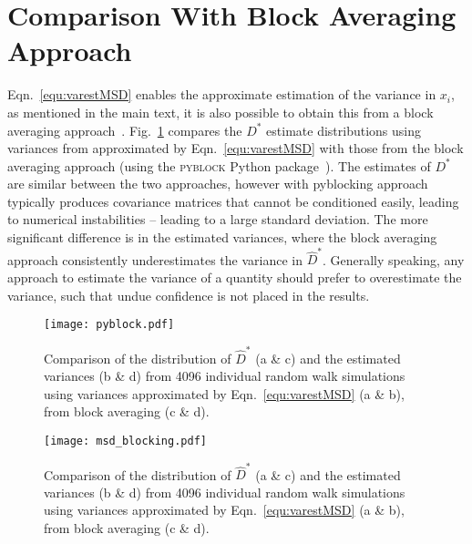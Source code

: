 \documentclass[reprint,superscriptaddress,nobibnotes,amsmath,amssymb,aps,prx,hidelinks,linenumbers]{revtex4-2}
\newcommand{\oMSDi}{\ensuremath{x_i}}
\newcommand{\Dest}{\ensuremath{\widehat{D}^*}}
\newcommand{\D}{\ensuremath{D^*}}
\begin{document}
\section{Comparison With Block Averaging Approach}
\label{sec:block}
Eqn.~\ref{equ:varestMSD} enables the approximate estimation of the variance in $\oMSDi$, as mentioned in the main text, it is also possible to obtain this from a block averaging approach~\cite{flyvbjerg_error_1989,frenkel_understanding_2023}.
Fig.~\ref{fig:pyblock} compares the $\D$ estimate distributions using variances from approximated by Eqn.~\ref{equ:varestMSD} with those from the block averaging approach (using the \textsc{pyblock} Python package~\cite{spencer_pyblock_2020}).
The estimates of $\D$ are similar between the two approaches, however with pyblocking approach typically produces covariance matrices that cannot be conditioned easily, leading to numerical instabilities -- leading to a large standard deviation.
The more significant difference is in the estimated variances, where the block averaging approach consistently underestimates the variance in $\Dest$. 
Generally speaking, any approach to estimate the variance of a quantity should prefer to overestimate the variance, such that undue confidence is not placed in the results. 

\begin{figure}
    \centering
    \texttt{[image: pyblock.pdf]}
    \caption{Comparison of the distribution of $\Dest$ (a \& c) and the estimated variances (b \& d) from 4096 individual random walk simulations using variances approximated by Eqn.~\ref{equ:varestMSD} (a \& b), from block averaging (c \& d).}
    \label{fig:pyblock}
\end{figure}

\begin{figure}
    \centering
    \texttt{[image: msd\_blocking.pdf]}
    \caption{Comparison of the distribution of $\Dest$ (a \& c) and the estimated variances (b \& d) from 4096 individual random walk simulations using variances approximated by Eqn.~\ref{equ:varestMSD} (a \& b), from block averaging (c \& d).}
    \label{fig:msd_blocking}
\end{figure}
\end{document}
